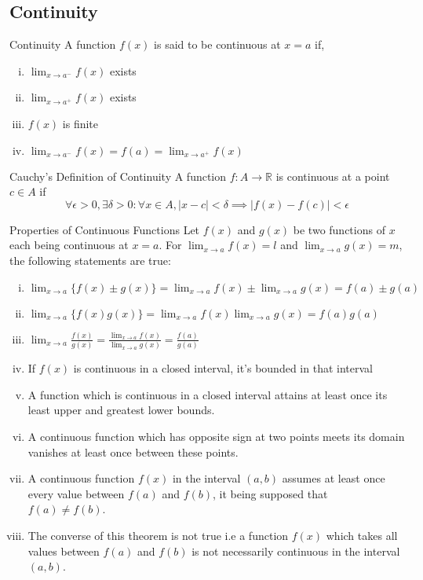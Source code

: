 
\subsection{Continuity}
\begin{definition}{Continuity}
    A function $f(x)$ is said to be continuous at $x=a$ if,
    \begin{enumerate}[(i)]
        \item $\lim_{x \to a^-} f(x)$ exists
        \item $\lim_{x \to a^+} f(x)$ exists
        \item $f(x)$ is finite
        \item $\lim_{x \to a^-} f(x) = f(a) = \lim_{x \to a^+} f(x)$
    \end{enumerate}
\end{definition}

\begin{definition}{Cauchy's Definition of Continuity}
    A function $f:A \to \mathbb{R}$ is continuous at a point $c\in A$ if \[
        \forall \epsilon>0, \exists\delta>0 : \forall x\in A, |x-c|<\delta \implies |f(x)-f(c)|<\epsilon
    \]
\end{definition}

\begin{theorem}{Properties of Continuous Functions}
    Let $f(x)$ and $g(x)$ be two functions of $x$ each being continuous at $x=a$. For $\lim_{x \to a} f(x) = l$ and $\lim_{x \to a} g(x) = m$, the following statements are true:
    \begin{enumerate}[(i)]
        \item $ \lim_{x \to a} \{ f(x)\pm g(x) \} = \lim_{x \to a} f(x) \pm \lim_{x \to a} g(x) = f(a)\pm g(a) $
        \item $ \lim_{x \to a} \{ f(x)g(x) \} = \lim_{x \to a} f(x)\lim_{x \to a} g(x) = f(a)g(a) $
        \item $ \lim_{x \to a} \frac{f(x)}{g(x)} = \frac{\lim_{x \to a} f(x)}{\lim_{x \to a} g(x)} = \frac{f(a)}{g(a)} $
        \item If $f(x)$ is continuous in a closed interval, it's bounded in that interval
        \item A function which is continuous in a closed interval attains at least once its least upper and greatest lower bounds.
        \item A continuous function which has opposite sign at two points meets its domain vanishes at least once between these points.
        \item A continuous function $f(x)$ in the interval $(a,b)$ assumes at least once every value between $f(a)$ and $f(b)$, it being supposed that $f(a) \neq f(b)$.
        \item The converse of this theorem is not true i.e a function $f(x)$ which takes all values between $f(a)$ and $f(b)$ is not necessarily continuous in the interval $(a,b)$.
    \end{enumerate}
\end{theorem}

